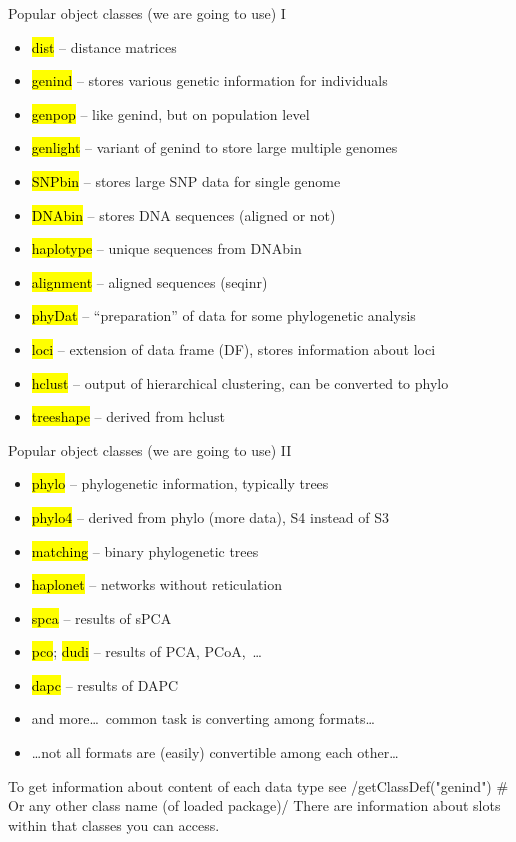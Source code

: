\documentclass[compress, ucs, xelatex, 11pt, xcolor=svgnames,
  hyperref={
    bookmarks=true,
    unicode=true,
    colorlinks=true,
    pdftitle={Molecular data in R},
    plainpages=false,
    pdfauthor={Vojtech Zeisek},
    pdfsubject={Course about phylogeny and evolution in R},
    pdfcreator={XeLaTeX},
    pdfkeywords={R, evolution, phylogeny, molecular data},
    linkcolor=Tomato,
    anchorcolor=SaddleBrown,
    citecolor=Goldenrod,
    filecolor=DarkMagenta,
    menucolor=Sienna,
    urlcolor=DarkTurquoise,
    pdftex},
  url={hyphens, lowtilde} %
  ]{beamer}
\renewcommand{\texttt}[1]{\hl{\ttfamily #1}}
\begin{document}
\begin{frame}{Popular object classes (we are going to use) I}
  \begin{itemize}
    \item \texttt{dist} -- distance matrices
    \item \texttt{genind} -- stores various genetic information for individuals
    \item \texttt{genpop} -- like genind, but on population level
    \item \texttt{genlight} -- variant of genind to store large multiple genomes
    \item \texttt{SNPbin} -- stores large SNP data for single genome
    \item \texttt{DNAbin} -- stores DNA sequences (aligned or not)
    \item \texttt{haplotype} -- unique sequences from DNAbin
    \item \texttt{alignment} -- aligned sequences (seqinr)
    \item \texttt{phyDat} -- ``preparation'' of data for some phylogenetic analysis
    \item \texttt{loci} -- extension of data frame (DF), stores information about loci
    \item \texttt{hclust} -- output of hierarchical clustering, can be converted to phylo
    \item \texttt{treeshape} -- derived from hclust
  \end{itemize}
\end{frame}

\begin{frame}[fragile]{Popular object classes (we are going to use) II}
  \begin{itemize}
    \item \texttt{phylo} -- phylogenetic information, typically trees
    \item \texttt{phylo4} -- derived from phylo (more data), S4 instead of S3
    \item \texttt{matching} -- binary phylogenetic trees
    \item \texttt{haplonet} -- networks without reticulation
    \item \texttt{spca} -- results of sPCA
    \item \texttt{pco}; \texttt{dudi} -- results of PCA, PCoA,~\ldots
    \item \texttt{dapc} -- results of DAPC
    \item and more\ldots~common task is converting among formats\ldots
    \item \ldots not all formats are (easily) convertible among each other\ldots
  \end{itemize}
  To get information about content of each data type see
  \splus/getClassDef("genind") # Or any other class name (of loaded package)/
  There are information about slots within that classes you can access.
\end{frame}
\end{document}
